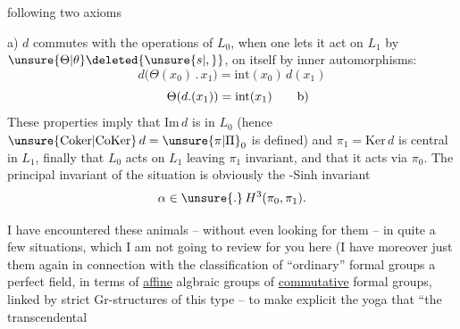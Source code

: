 following two axioms

a) $d$ commutes with the operations of $L_0$, when one lets it act on $L_1$ by $\unsure{\Theta|\theta}\deleted{\unsure{s|,}}$, on itself by inner automorphisms:
\[
d\bigl(\Theta(x_0)\mathbin{.}x_1\bigr)=\mathrm{int}(x_0)\,d(x_1)
\]
\[
\Theta(d.(x_1))=\mathrm{int}(x_1)\tag*{\makebox[0pt][r]{\makebox[\displaywidth][l]{b)}}}
\]
These properties imply that $\mathrm{Im}\,d$ is  in $L_0$ (hence $\unsure{\mathrm{Coker}|\mathrm{CoKer}}\,d=\unsure{\pi|\Pi}_0$ is defined) and $\pi_1=\mathrm{Ker}\,d$ is central in $L_1$, finally that $L_0$ acts on $L_1$ leaving $\pi_1$ invariant, and that it acts via $\pi_0$. The principal  invariant of the situation is obviously the -Sinh invariant
\[
\alpha\in\unsure{.}\,H^3(\pi_0,\pi_1).
\]

I have encountered these animals -- without even looking for them -- in quite a few situations, which I am not going to review for you here (I have moreover just  them again in connection with the classification of ``ordinary'' formal groups  a perfect field, in terms of \uline{affine} algbraic groups\unsure{,|;} of \uline{commutative} formal groups, linked by strict Gr-structures of this type%
 -- to make explicit the yoga that ``the transcendental  
